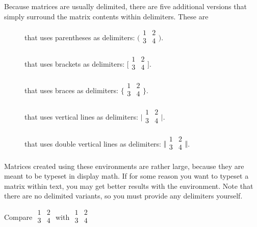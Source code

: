 Because matrices are usually delimited, there are five additional versions that
simply surround the matrix contents within delimiters. These are
\begin{description}
  \item[] that uses parentheses as delimiters:
    \(\bigl(
    \begin{smallmatrix}
      1 & 2 \\
      3 & 4 \\
    \end{smallmatrix}
    \bigr)\).
  \item[] that uses brackets as delimiters:
    \(\bigl[
      \begin{smallmatrix}
        1 & 2 \\
        3 & 4 \\
      \end{smallmatrix}
      \bigr]\).
  \item[] that uses braces as delimiters:
    \(\bigl\{
    \begin{smallmatrix}
      1 & 2 \\
      3 & 4 \\
    \end{smallmatrix}
    \bigr\}\).
  \item[] that uses vertical lines as delimiters:
    \(\bigl\vert
    \begin{smallmatrix}
      1 & 2 \\
      3 & 4 \\
    \end{smallmatrix}
    \bigr\vert\).
  \item[] that uses double vertical lines as delimiters:
    \(\bigl\Vert
    \begin{smallmatrix}
      1 & 2 \\
      3 & 4 \\
    \end{smallmatrix}
    \bigr\Vert\).
\end{description}

Matrices created using these environments are rather large, because they are
meant to be typeset in display math. If for some reason you want to typeset a
matrix within text, you may get better results with the 
environment. Note that there are no delimited variants, so you must
provide any delimiters yourself.
\begin{example}
Compare \(
  \begin{matrix}
    1 & 2 \\
    3 & 4 \\
  \end{matrix}
\) with \(
  \begin{smallmatrix}
    1 & 2 \\
    3 & 4 \\
  \end{smallmatrix}
\)
\end{example}

